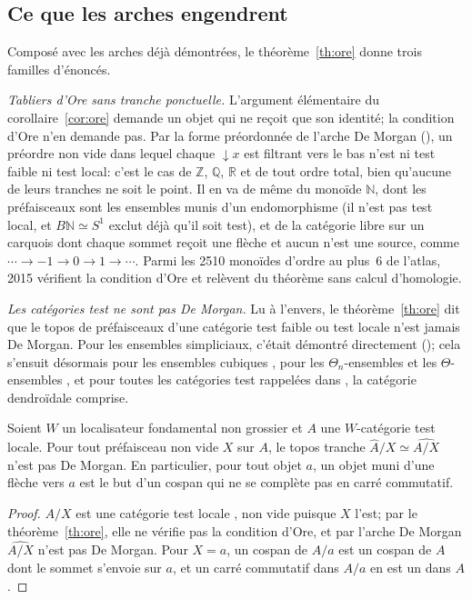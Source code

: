\subsection{Ce que les arches engendrent}

Composé avec les arches déjà démontrées, le théorème~\ref{th:ore} donne trois familles d'énoncés.

\emph{Tabliers d'Ore sans tranche ponctuelle.} L'argument élémentaire du corollaire~\ref{cor:ore} demande un objet qui ne reçoit que son identité; la condition d'Ore n'en demande pas. Par la forme préordonnée de l'arche De Morgan (), un préordre non vide dans lequel chaque $\downarrow x$ est filtrant vers le bas n'est ni test faible ni test local: c'est le cas de $\mathbb Z$, $\mathbb Q$, $\mathbb R$ et de tout ordre total, bien qu'aucune de leurs tranches ne soit le point. Il en va de même du monoïde $\mathbb N$, dont les préfaisceaux sont les ensembles munis d'un endomorphisme (il n'est pas test local, et $B\mathbb N\simeq S^1$ exclut déjà qu'il soit test), et de la catégorie libre sur un carquois dont chaque sommet reçoit une flèche et aucun n'est une source, comme $\cdots\to-1\to0\to1\to\cdots$. Parmi les 2510 monoïdes d'ordre au plus~6 de l'atlas, 2015 vérifient la condition d'Ore et relèvent du théorème sans calcul d'homologie.

\emph{Les catégories test ne sont pas De Morgan.} Lu à l'envers, le théorème~\ref{th:ore} dit que le topos de préfaisceaux d'une catégorie test faible ou test locale n'est jamais De Morgan. Pour les ensembles simpliciaux, c'était démontré directement (); cela s'ensuit désormais pour les ensembles cubiques \cite[cor.~8.4.13]{cisinski-308}, pour les $\Theta_n$-ensembles et les $\Theta$-ensembles \cite[th.~6.5]{hubert-dk}, et pour toutes les catégories test rappelées dans \cite[introduction]{hubert-dk}, la catégorie dendroïdale comprise.

\begin{proposition}\label{prop:slices}
Soient $W$ un localisateur fondamental non grossier et $A$ une $W$-catégorie test locale. Pour tout préfaisceau non vide $X$ sur $A$, le topos tranche $\widehat A/X\simeq\widehat{A/X}$ n'est pas De Morgan. En particulier, pour tout objet $a$, un objet muni d'une flèche vers $a$ est le but d'un cospan qui ne se complète pas en carré commutatif.
\end{proposition}

\begin{proof}
$A/X$ est une catégorie test locale \cite[prop.~4.1.14 (v)]{cisinski-308}, non vide puisque $X$ l'est; par le théorème~\ref{th:ore}, elle ne vérifie pas la condition d'Ore, et par l'arche De Morgan $\widehat{A/X}$ n'est pas De Morgan. Pour $X = a$, un cospan de $A/a$ est un cospan de $A$ dont le sommet s'envoie sur $a$, et un carré commutatif dans $A/a$ en est un dans $A$.
\end{proof}

